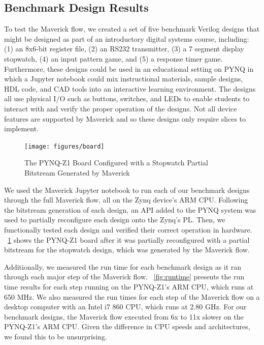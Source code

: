 \subsection{Benchmark Design Results}
\label{sec:results}

To test the Maverick flow, we created a set of five benchmark Verilog designs that might be designed as part of an introductory digital systems course, including: (1) an 8x6-bit register file, (2) an RS232 transmitter, (3) a 7 segment display stopwatch, (4) an input pattern game, and (5) a response timer game.
Furthermore, these designs could be used in an educational setting on PYNQ in which a Jupyter notebook could mix instructional materials, sample designs, HDL code, and CAD tools into an interactive learning environment.
The designs all use physical I/O such as buttons, switches, and LEDs to enable students to interact with and verify the proper operation of the designs.
Not all device features are supported by Maverick and so these designs only require slices to implement.

\begin{figure}
	\centering
	\texttt{[image: figures/board]}
	\caption{The PYNQ-Z1 Board Configured with a Stopwatch Partial Bitstream Generated by Maverick}
	\label{fig:board}
\end{figure}

We used the Maverick Jupyter notebook to run each of our benchmark designs through the full Maverick flow, all on the Zynq device's ARM CPU.
Following the bitstream generation of each design, an API added to the PYNQ system \cite{Goeders:2018} was used to partially reconfigure each design onto the Zynq's PL. 
Then, we functionally tested each design and verified their correct operation in hardware.
\figurename~\ref{fig:board} shows the PYNQ-Z1 board after it was partially reconfigured with a partial bitstream for the stopwatch design, which was generated by the Maverick flow. 

Additionally, we measured the run time for each benchmark design as it ran through each major step of the Maverick flow.
\figurename~\ref{fig:runtime} presents the run time results for each step running on the PYNQ-Z1's ARM CPU, which runs at 650 MHz. 
We also measured the run times for each step of the Maverick flow on a desktop computer with an Intel i7 860 CPU, which runs at 2.80 GHz.
For our benchmark designs, the Maverick flow executed from 6x to 11x slower on the PYNQ-Z1's ARM CPU.
Given the difference in CPU speeds and architectures, we found this to be unsurprising. 


